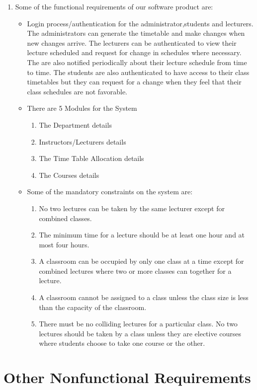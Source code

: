 \documentclass{scrreprt}
\begin{document}
\begin{enumerate}
\item Some of the functional requirements of our software product are:
\begin{itemize}
\item Login process/authentication for the administrator,students and lecturers. The administrators can generate the timetable and  make changes when new changes arrive. The lecturers can be authenticated to view their lecture scheduled and request for change in schedules where necessary. The are also notified periodically about their lecture schedule from time to time. The students are also authenticated to have access to their class timetables but they can request for a change when they feel that their class schedules are not favorable.
\item There are 5 Modules for the System
\begin{enumerate}
\item The  Department details 
\item Instructors/Lecturers details
\item The Time Table Allocation details
\item The Courses details
\end{enumerate}
\item Some of the mandatory constraints on the system are:
\begin {enumerate}
\item No two lectures can be taken by the same lecturer except for combined classes.
\item The minimum time for a lecture should be at least one hour and at most four hours.
\item A classroom can be occupied by only one class at a time except  for  combined lectures  where two or more classes can together for a  lecture.
\item A classroom cannot be assigned to a class unless the class size is  less than the capacity of the classroom.
\item There must be no colliding lectures for a particular class. No two lectures should be taken by a class unless they are elective courses where students choose to take one course or the other.
\end {enumerate}
\end {itemize}
\end{enumerate}
 


\chapter{Other Nonfunctional Requirements}
\end{document}
